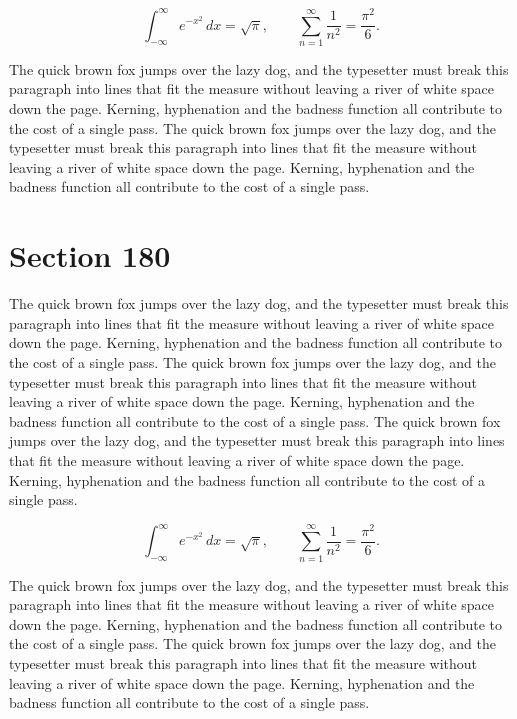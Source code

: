 \documentclass{article}
\begin{document}
\begin{equation}
\int_{-\infty}^{\infty} e^{-x^{2}}\,dx = \sqrt{\pi}, \qquad
\sum_{n=1}^{\infty} \frac{1}{n^{2}} = \frac{\pi^{2}}{6}.
\end{equation}

The quick brown fox jumps over the lazy dog, and the typesetter must break this paragraph into lines that fit the measure without leaving a river of white space down the page. Kerning, hyphenation and the badness function all contribute to the cost of a single pass. The quick brown fox jumps over the lazy dog, and the typesetter must break this paragraph into lines that fit the measure without leaving a river of white space down the page. Kerning, hyphenation and the badness function all contribute to the cost of a single pass. 
\section{Section 180}
The quick brown fox jumps over the lazy dog, and the typesetter must break this paragraph into lines that fit the measure without leaving a river of white space down the page. Kerning, hyphenation and the badness function all contribute to the cost of a single pass. The quick brown fox jumps over the lazy dog, and the typesetter must break this paragraph into lines that fit the measure without leaving a river of white space down the page. Kerning, hyphenation and the badness function all contribute to the cost of a single pass. The quick brown fox jumps over the lazy dog, and the typesetter must break this paragraph into lines that fit the measure without leaving a river of white space down the page. Kerning, hyphenation and the badness function all contribute to the cost of a single pass. 

\begin{equation}
\int_{-\infty}^{\infty} e^{-x^{2}}\,dx = \sqrt{\pi}, \qquad
\sum_{n=1}^{\infty} \frac{1}{n^{2}} = \frac{\pi^{2}}{6}.
\end{equation}

The quick brown fox jumps over the lazy dog, and the typesetter must break this paragraph into lines that fit the measure without leaving a river of white space down the page. Kerning, hyphenation and the badness function all contribute to the cost of a single pass. The quick brown fox jumps over the lazy dog, and the typesetter must break this paragraph into lines that fit the measure without leaving a river of white space down the page. Kerning, hyphenation and the badness function all contribute to the cost of a single pass. 
\end{document}
